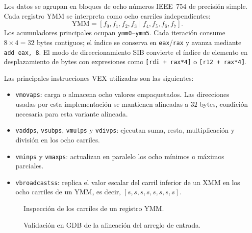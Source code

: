 \documentclass[journal]{IEEEtran}
\begin{document}
Los datos se agrupan en bloques de ocho números IEEE~754 de precisión simple.
Cada registro YMM se interpreta como ocho carriles independientes:
\begin{equation}
  \mathrm{YMM}=
  [f_0,f_1,f_2,f_3\mid f_4,f_5,f_6,f_7].
  \label{eq:ymm-lanes}
\end{equation}
Los acumuladores principales ocupan \texttt{ymm0}--\texttt{ymm5}. Cada
iteración consume $8\times4=32$ bytes contiguos; el índice se conserva en
\texttt{eax}/\texttt{rax} y avanza mediante \texttt{add eax, 8}. El modo de
direccionamiento SIB convierte el índice de elemento en desplazamiento de bytes
con expresiones como \texttt{[rdi + rax*4]} o
\texttt{[r12 + rax*4]}.

Las principales instrucciones VEX utilizadas son las siguientes:
\begin{itemize}
  \item \texttt{vmovaps}: carga o almacena ocho valores empaquetados. Las
  direcciones usadas por esta implementación se mantienen alineadas a 32 bytes,
  condición necesaria para esta variante alineada.
  \item \texttt{vaddps}, \texttt{vsubps}, \texttt{vmulps} y
  \texttt{vdivps}: ejecutan suma, resta, multiplicación y división en los ocho
  carriles.
  \item \texttt{vminps} y \texttt{vmaxps}: actualizan en paralelo los ocho
  mínimos o máximos parciales.
  \item \texttt{vbroadcastss}: replica el valor escalar del carril inferior de
  un XMM en los ocho carriles de un YMM, es decir,
  $[s,s,s,s,s,s,s,s]$.
\end{itemize}

\begin{figure}[H]
  \centering
  \caption{Inspección de los carriles de un registro YMM.}
  \label{fig:gdb-ymm-lanes}
\end{figure}

\begin{figure}[H]
  \centering
  \caption{Validación en GDB de la alineación del arreglo de entrada.}
  \label{fig:gdb-alineacion-avx2}
\end{figure}
\end{document}
